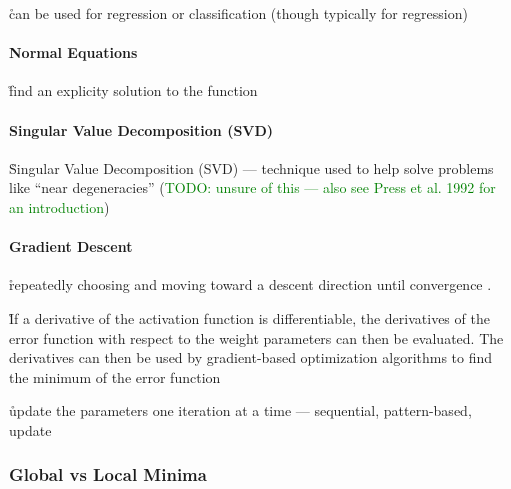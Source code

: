 \r{can be used for regression or classification (though typically for regression)}

 
\paragraph{Normal Equations}

\r{find an explicity solution to the function}

\paragraph{Singular Value Decomposition (SVD)}

\r{Singular Value Decomposition (SVD) --- technique used to help solve problems like ``near degeneracies'' (\textcolor{green}{TODO: unsure of this --- also see Press et al. 1992 for an introduction})}


\paragraph{Gradient Descent}

\r{repeatedly choosing and moving toward a descent direction until convergence} . 


\r{If a derivative of the activation function is differentiable, the derivatives of the error function with respect to the weight parameters can then be evaluated. The derivatives can then be used by gradient-based optimization algorithms to find the minimum of the error function }

\r{update the parameters one iteration at a time --- sequential, pattern-based, update}


\subsubsection{Global vs Local Minima}

